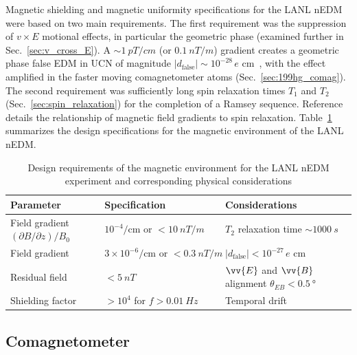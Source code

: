 Magnetic shielding and magnetic uniformity specifications for the LANL nEDM were based on two main requirements. The first requirement was the suppression of $v\times E$ motional effects, in particular the geometric phase (examined further in Sec.~\ref{sec:v_cross_E}). A $\sim\qty{1}{pT\per cm}$ (or $\qty{0.1}{nT\per m}$) gradient creates a geometric phase false EDM in UCN of magnitude $|d_\text{false}|\sim 10^{-28}\,e\text{ cm}$~\cite{lamoreaux_geometric_phase_2005}, with the effect amplified in the faster moving \hg comagnetometer atoms (Sec.~\ref{sec:199hg_comag}). The second requirement was sufficiently long spin relaxation times $T_1$ and $T_2$ (Sec.~\ref{sec:spin_relaxation}) for the completion of a Ramsey sequence. Reference~\cite{mcgregor_transverse_1990} details the relationship of magnetic field gradients to spin relaxation. Table~\ref{tb:lanl_magnetic_design} summarizes the design specifications for the magnetic environment of the LANL nEDM. 

\begin{table}
\centering
\caption{Design requirements of the magnetic environment for the LANL nEDM experiment and corresponding physical considerations}\label{tb:lanl_magnetic_design}
\begin{tabular}{
    lll
}
\toprule
Parameter		& Specification				& Considerations	\\
\midrule
Field gradient $(\partial B/\partial z)/B_0$	& $10^{-4}/\text{cm or } <\qty{10}{nT\per m}$ & $T_2$ relaxation time $\sim\qty{1000}{s}$\\
Field gradient  & $3\times 10^{-6}/\text{cm or }<\qty{0.3}{nT\per m}$ & $|d_\text{false}|<10^{-27}\,e\text{ cm}$ \\
Residual field & $<\qty{5}{nT}$ & $\vv{E}$ and $\vv{B}$ alignment $\theta_{EB}<\qty{0.5}{\degree}$ \\
Shielding factor & $>10^4$ for $f>\qty{0.01}{Hz}$ & Temporal drift \\
\bottomrule
\end{tabular}
\end{table}


\subsection
{
    \texorpdfstring{\hg Comagnetometer}
                    {199Hg Comagnetometer}\label{sec:199hg_comag}
}


